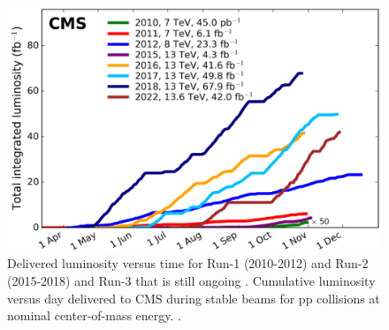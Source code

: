 \begin{center}
  \begin{figure}[h!]
    \centering
    \includegraphics[scale=.28]{Chapter1/int_lumi_per_year.png}
    \caption[CMS Luminosity per year]{Delivered luminosity versus time for Run-1 (2010-2012)\cite{pas_17} and Run-2 (2015-2018)\cite{pas_18} and Run-3 that is still ongoing . Cumulative luminosity versus day delivered to CMS during stable beams for pp collisions at nominal center-of-mass energy.  \cite{wikicern}.}
    \label{lumi_per_year_int}
  \end{figure}
\end{center}
